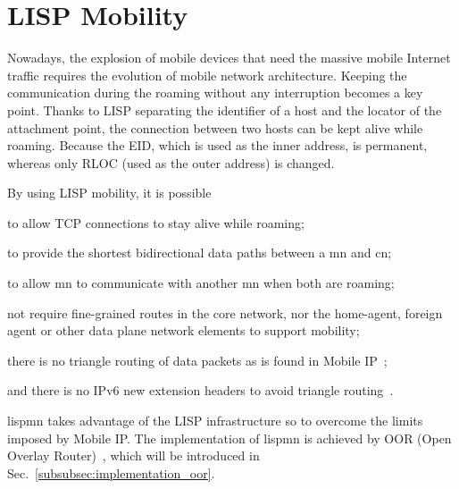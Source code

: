\section{LISP Mobility}
\label{sec:lisp_mobility}
Nowadays, the explosion of mobile devices that need the massive mobile Internet traffic requires the evolution of mobile network architecture. Keeping the communication during the roaming without any interruption becomes a key point. Thanks to LISP separating the identifier of a host and the locator of the attachment point, the connection between two hosts can be kept alive while roaming. Because the EID, which is used as the inner address, is permanent, whereas only RLOC (used as the outer address) is changed. 

By using LISP mobility, it is possible 
\begin{inparaenum}[1)]
	\item to allow TCP connections to stay alive while roaming;
	\item to provide the shortest bidirectional data paths between a \acrfull{mn} and \acrfull{cn};
	\item to allow \acrshort{mn} to communicate with another \acrshort{mn} when both are roaming;
	\item not require fine-grained routes in the core network, nor the home-agent, foreign agent or other data plane network elements to support mobility;
	\item there is no triangle routing of data packets as is found in Mobile IP~\cite{perkins2002rfc3344};
	\item and there is no IPv6 new extension headers to avoid triangle routing~\cite{johnson2004rfc}.
\end{inparaenum}
\acrfull{lispmn} takes advantage of the LISP infrastructure so to overcome the limits imposed by Mobile IP. %
The implementation of \acrshort{lispmn} is achieved by OOR (Open Overlay Router)~\cite{OOR}, which will be introduced in Sec.~\ref{subsubsec:implementation_oor}.

